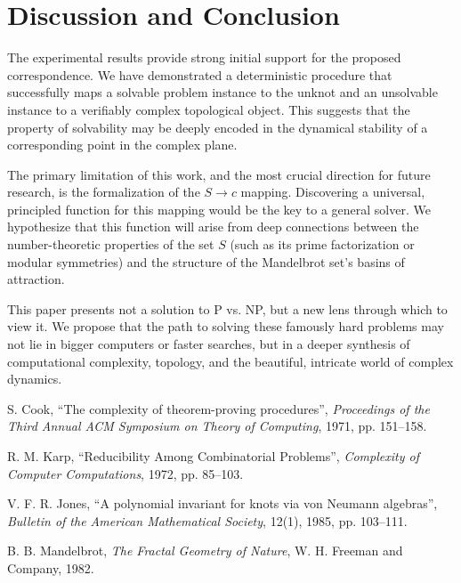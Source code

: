 \documentclass[11pt, a4paper]{article}
\begin{document}
\section{Discussion and Conclusion}

The experimental results provide strong initial support for the proposed correspondence. We have demonstrated a deterministic procedure that successfully maps a solvable problem instance to the unknot and an unsolvable instance to a verifiably complex topological object. This suggests that the property of solvability may be deeply encoded in the dynamical stability of a corresponding point in the complex plane.

The primary limitation of this work, and the most crucial direction for future research, is the formalization of the $S \to c$ mapping. Discovering a universal, principled function for this mapping would be the key to a general solver. We hypothesize that this function will arise from deep connections between the number-theoretic properties of the set $S$ (such as its prime factorization or modular symmetries) and the structure of the Mandelbrot set's basins of attraction.

This paper presents not a solution to P vs. NP, but a new lens through which to view it. We propose that the path to solving these famously hard problems may not lie in bigger computers or faster searches, but in a deeper synthesis of computational complexity, topology, and the beautiful, intricate world of complex dynamics.

\begin{thebibliography}{9}

S. Cook,
``The complexity of theorem-proving procedures'',
\emph{Proceedings of the Third Annual ACM Symposium on Theory of Computing}, 1971, pp. 151--158.

R. M. Karp,
``Reducibility Among Combinatorial Problems'',
\emph{Complexity of Computer Computations}, 1972, pp. 85--103.

V. F. R. Jones,
``A polynomial invariant for knots via von Neumann algebras'',
\emph{Bulletin of the American Mathematical Society}, 12(1), 1985, pp. 103--111.

B. B. Mandelbrot,
\emph{The Fractal Geometry of Nature},
W. H. Freeman and Company, 1982.

\end{thebibliography}
\end{document}
